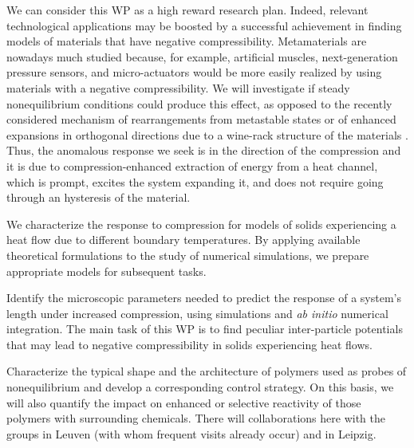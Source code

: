 \begin{workpackage}
\begin{wpdescription}
We can consider this WP as a high reward research plan. Indeed, relevant technological applications
may be boosted by a successful achievement in finding models of materials that have negative compressibility.
Metamaterials are nowadays much studied \cite{NM12,CG15} because, for example, artificial muscles,
next-generation pressure sensors, and micro-actuators would be
more easily realized by using materials with a negative compressibility. We will investigate
if steady nonequilibrium conditions could produce this effect, as opposed to the recently considered 
mechanism of rearrangements from metastable states \cite{NM12} or of enhanced expansions in orthogonal directions
due to a wine-rack structure of the materials \cite{CG15}. Thus, the anomalous response we seek is in the direction
of the compression and it is due to compression-enhanced extraction of energy from a heat channel,
which is prompt, excites the system expanding it, 
and does not require going through an hysteresis of the material. 

\printbibliography[heading=proposal-bib,env=proposal-env]

\end{wpdescription}

\begin{tasklist}

  \begin{task}[title=TASK1,id=task1,PM=3,lead=UNIPD,wphases={0-12!1,12-24!0.5}]
  We characterize the response to compression
  for models of solids experiencing a heat flow due to different boundary temperatures.
  By applying available theoretical formulations to the study of numerical simulations,
  we prepare appropriate models for subsequent tasks.
  \end{task}

  \begin{task}[title=TASK2,id=task2,PM=3,lead=UNIPD,partners=KUL,wphases={12-24!0.5,24-36!1}]
  Identify the microscopic parameters needed to predict the response
  of a system's length under increased compression, using simulations
  and {\it ab initio} numerical integration.
  The main task of this WP is to find peculiar inter-particle
  potentials that may lead to negative compressibility in solids
  experiencing heat flows.
  \end{task}

  \begin{task}[title=TASK3,id=task3,PM=6,lead=UNIPD,wphases={18-24!0.5,24-48!1},partners={KUL,ULEI}]
  Characterize the typical shape and the architecture of polymers used
  as probes of nonequilibrium and develop a corresponding control
  strategy.
%
  On this basis, we will also quantify the impact on enhanced or
  selective reactivity of those polymers with surrounding chemicals.
  There will collaborations here with the groups in Leuven (with whom
  frequent visits already occur) and in Leipzig.
  \end{task}


\end{tasklist}
\end{workpackage}
